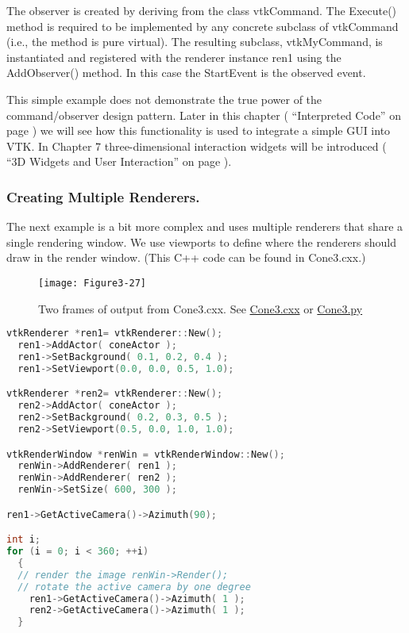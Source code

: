 The observer is created by deriving from the class vtkCommand. The Execute() method is required to be implemented by any concrete subclass of vtkCommand (i.e., the method is pure virtual). The resulting subclass, vtkMyCommand, is instantiated and registered with the renderer instance ren1 using the AddObserver() method. In this case the StartEvent is the observed event.

This simple example does not demonstrate the true power of the command/observer design pattern. Later in this chapter ( ``Interpreted Code'' on page \pageref{pg:ic} ) we will see how this functionality is used to integrate a simple GUI into VTK. In Chapter 7 three-dimensional interaction widgets will be introduced ( ``\gls{3D Widget}s and User Interaction''  on page \pageref{sec:3dwui} ).

\subsubsection{Creating Multiple Renderers.}
The next example is a bit more complex and uses multiple renderers that share a single rendering window. We use viewports to define where the renderers should draw in the render window. (This C++ code can be found in Cone3.cxx.)

\begin{figure}[!htb]
  \centering
  \texttt{[image: Figure3-27]}\\
  \caption{Two frames of output from Cone3.cxx. See  \href{https://lorensen.github.io/VTKExamples/site/Cxx/Rendering/Cone3/}{Cone3.cxx} or \href{https://lorensen.github.io/VTKExamples/site/Python/Rendering/Cone3/}{Cone3.py}}\label{fig:Figure3-27}
\end{figure}

\begin{lstlisting}[language=C++, caption={Cone3.cxx}]
vtkRenderer *ren1= vtkRenderer::New();
  ren1->AddActor( coneActor );
  ren1->SetBackground( 0.1, 0.2, 0.4 );
  ren1->SetViewport(0.0, 0.0, 0.5, 1.0);

vtkRenderer *ren2= vtkRenderer::New();
  ren2->AddActor( coneActor );
  ren2->SetBackground( 0.2, 0.3, 0.5 );
  ren2->SetViewport(0.5, 0.0, 1.0, 1.0);

vtkRenderWindow *renWin = vtkRenderWindow::New();
  renWin->AddRenderer( ren1 );
  renWin->AddRenderer( ren2 );
  renWin->SetSize( 600, 300 );

ren1->GetActiveCamera()->Azimuth(90);

int i;
for (i = 0; i < 360; ++i)
  {
  // render the image renWin->Render();
  // rotate the active camera by one degree
    ren1->GetActiveCamera()->Azimuth( 1 );
    ren2->GetActiveCamera()->Azimuth( 1 );
  }
\end{lstlisting}

